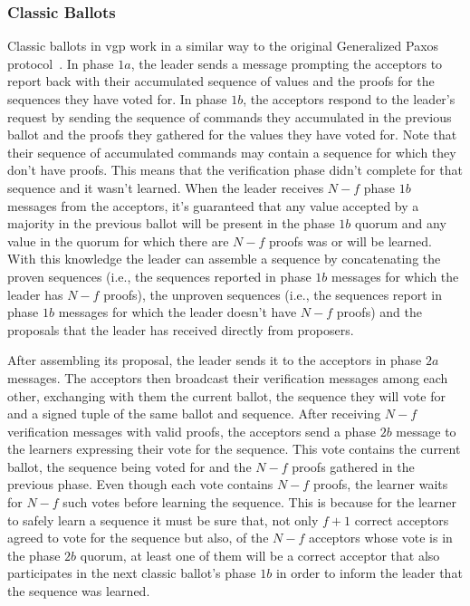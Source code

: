 \subsubsection{Classic Ballots}
Classic ballots in \acrshort{vgp} work in a similar way to the original Generalized Paxos protocol~\cite{Lamport2005}. In phase $1a$, the leader sends a message prompting the acceptors to report back with their accumulated sequence of values and the proofs for the sequences they have voted for. In phase $1b$, the acceptors respond to the leader's request by sending the sequence of commands they accumulated in the previous ballot and the proofs they gathered for the values they have voted for. Note that their sequence of accumulated commands may contain a sequence for which they don't have proofs. This means that the verification phase didn't complete for that sequence and it wasn't learned. When the leader receives $N-f$ phase $1b$ messages from the acceptors, it's guaranteed that any value accepted by a majority in the previous ballot will be present in the phase $1b$ quorum and any value in the quorum for which there are $N-f$ proofs was or will be learned. With this knowledge the leader can assemble a sequence by concatenating the proven sequences (i.e., the sequences reported in phase $1b$ messages for which the leader has $N-f$ proofs), the unproven sequences  (i.e., the sequences report in phase $1b$ messages for which the leader doesn't have $N-f$ proofs) and the proposals that the leader has received directly from proposers. \par
After assembling its proposal, the leader sends it to the acceptors in phase $2a$ messages. The acceptors then broadcast their verification messages among each other, exchanging with them the current ballot, the sequence they will vote for and a signed tuple of the same ballot and sequence. After receiving $N-f$ verification messages with valid proofs, the acceptors send a phase $2b$ message to the learners expressing their vote for the sequence. This vote contains the current ballot, the sequence being voted for and the $N-f$ proofs gathered in the previous phase. Even though each vote contains $N-f$ proofs, the learner waits for $N-f$ such votes before learning the sequence. This is because for the learner to safely learn a sequence it must be sure that, not only $f+1$ correct acceptors agreed to vote for the sequence but also, of the $N-f$ acceptors whose vote is in the phase $2b$ quorum, at least one of them will be a correct acceptor that also participates in the next classic ballot's phase $1b$ in order to inform the leader that the sequence was learned.

